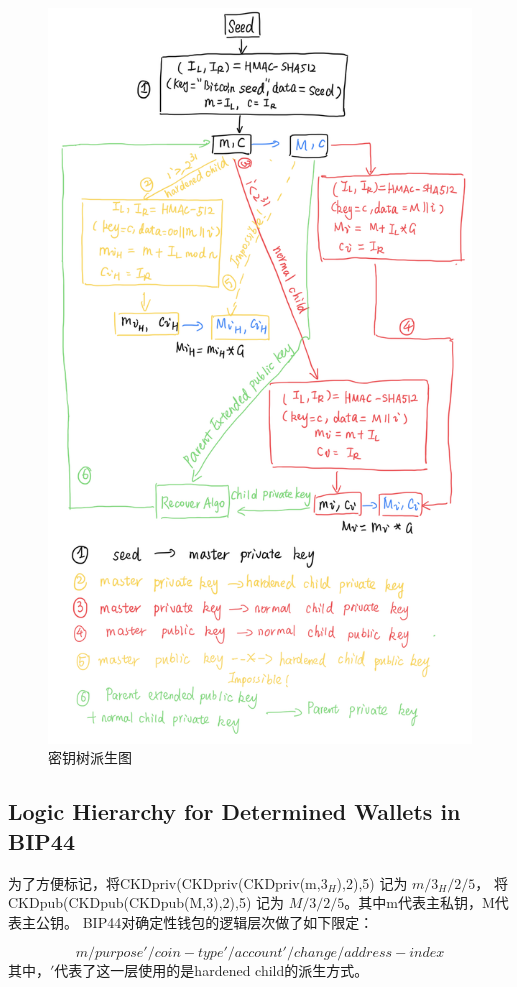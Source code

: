 \begin{figure}[h]
\centering
\includegraphics[width=.8\textwidth]{./outline.png}
\caption{密钥树派生图}\label{fig-parsesig}
\end{figure}

\subsection{Logic Hierarchy for Determined Wallets in BIP44}

为了方便标记，将CKDpriv(CKDpriv(CKDpriv(m,$3_H$),2),5) 记为 $m/3_H/2/5$，
将CKDpub(CKDpub(CKDpub(M,3),2),5) 记为 $M/3/2/5$。其中m代表主私钥，M代表主公钥。
BIP44对确定性钱包的逻辑层次做了如下限定：

$$m / purpose' / coin-type' / account' / change / address-index$$
其中，$'$代表了这一层使用的是hardened child的派生方式。

